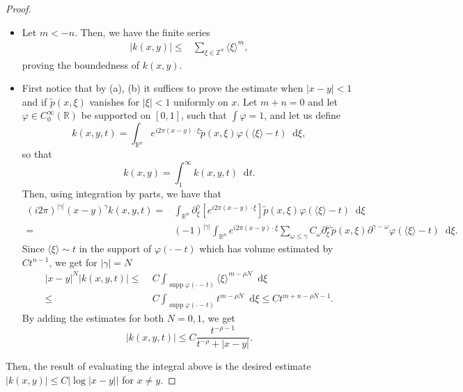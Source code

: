 \documentclass[12pt, reqno]{amsart}
\theoremstyle{definition}
\theoremstyle{remark}
\numberwithin{equation}{section}
\newcommand*\diff{\mathop{}\!\mathrm{d}}
\DeclareMathOperator{\supp}{supp}
\begin{document}
\begin{proof}
\begin{itemize}
        \item[(c)] Let $ m < -n$. Then, we have the finite series
        \begin{align*}
            | k(x, y)| \leq &  \sum_{\xi \in \mathbb{Z}^n}\langle\xi\rangle^m,
        \end{align*}
        proving the boundedness of $k(x, y)$.\\

        \item[(d)] First notice that by (a), (b) it suffices to prove the estimate when $|x-y|<1$ and if $\tilde{p}(x, \xi)$ vanishes for $|\xi|<1$ uniformly on $x$. Let $m + n = 0$ and let $\varphi \in C_0^\infty(\mathbb{R})$ be supported on $[0, 1]$, such that $\int \varphi=1$, and let us define 
        \begin{equation*}
            k(x, y, t) = \int_{\mathbb{R}^n} e^{i2\pi(x-y)\cdot \xi} \tilde{p}(x, \xi) \varphi(\langle\xi\rangle-t) \diff\xi,
        \end{equation*}
        so that
        \begin{equation*}
            k(x, y) = \int_1^\infty k(x, y, t)\diff t.
        \end{equation*}
        Then, using integration by parts, we have that
        \begin{align*}
            (i2\pi)^{|\gamma|}(x - y)^\gamma k(x, y, t) = & \int_{\mathbb{R}^n} \partial^\gamma_\xi\left[ e^{i2\pi(x-y)\cdot \xi} \right] \tilde{p}(x, \xi)\varphi(\langle\xi\rangle - t) \diff \xi \\
            = & (-1)^{|\gamma|} \int_{\mathbb{R}^n} e^{i2\pi(x-y)\cdot \xi} \sum_{\omega \leq \gamma}C_\omega \partial^\omega_\xi \tilde{p}(x, \xi) \partial^{\gamma - \omega}\varphi(\langle\xi\rangle-t) \diff \xi.
        \end{align*}
        Since $\langle\xi\rangle \sim t$ in the support of $\varphi(\cdot-t)$ which has volume estimated by $Ct^{n-1}$, we get for $|\gamma|=N$
        \begin{align*}
            |x-y|^N|k(x, y, t)| \leq & \;C \int_{\supp \varphi(\cdot - t)} \langle\xi\rangle^{m - \rho N} \diff \xi \\
            \leq & \; C\int_{\supp \varphi(\cdot - t)} t^{m-\rho N}\diff\xi \leq Ct^{m+n - \rho N-1}.
        \end{align*}
        By adding the estimates for both $N = 0, 1$, we get 
        \begin{equation*}
            |k(x, y, t)| \leq C \frac{t^{ -\rho - 1}}{t^{-\rho } + |x - y|}.
        \end{equation*}           
    \end{itemize} Then, the result of evaluating the integral above is the desired estimate $|k(x, y)| \leq  C|\log |x-y|| $ for $x \neq y$.
\end{proof}
\end{document}
